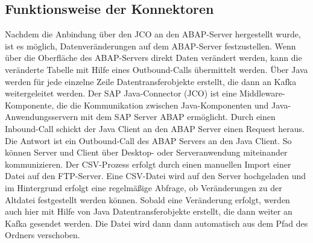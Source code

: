 \subsection*{Funktionsweise der Konnektoren}
Nachdem die Anbindung über den JCO an den ABAP-Server hergestellt wurde, ist es möglich, Datenveränderungen auf dem ABAP-Server festzustellen. Wenn über die Oberfläche des ABAP-Servers direkt Daten verändert werden, kann die veränderte Tabelle mit Hilfe eines Outbound-Calls übermittelt werden.
\newline
Über Java werden für jede einzelne Zeile Datentransferobjekte erstellt, die dann an Kafka weitergeleitet werden.
\newline
\newline
Der SAP Java-Connector (JCO) ist eine Middleware-Komponente, die die Kommunikation zwischen Java-Komponenten und Java-Anwendungsservern mit dem SAP Server ABAP ermöglicht.
\newline
Durch einen Inbound-Call schickt der Java Client an den ABAP Server einen Request heraus. Die Antwort ist ein Outbound-Call des ABAP Servers an den Java Client.
\newline
So können Server und Client über Desktop- oder Serveranwendung miteinander kommunizieren.
\newline
\newline
Der CSV-Prozess erfolgt durch einen manuellen Import einer Datei auf den FTP-Server. Eine CSV-Datei wird auf den Server hochgeladen und im Hintergrund erfolgt eine regelmäßige Abfrage, ob Veränderungen zu der Altdatei festgestellt werden können. Sobald eine Veränderung erfolgt, werden auch hier mit Hilfe von Java Datentransferobjekte erstellt, die dann weiter an Kafka gesendet werden.
Die Datei wird dann dann automatisch aus dem Pfad des Ordners verschoben.

